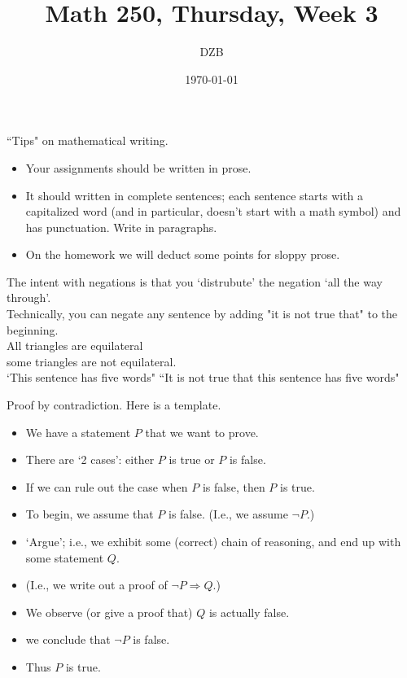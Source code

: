 \documentclass[12pt]{article}
\title{Math 250, Thursday, Week 3}
\author{DZB}
\date{\today}
\begin{document}
\maketitle

``Tips" on mathematical writing. 
\\

\begin{itemize}
\item Your assignments should be written in prose. 
\item It should written in complete sentences; each sentence starts with a capitalized word (and in particular, doesn't start with a math symbol) and has punctuation. Write in paragraphs. 
\item On the homework we will deduct some points for sloppy prose. 
\end{itemize}

The intent with negations is that you `distrubute' the negation `all the way through'. 
\\

Technically, you can negate any sentence by adding "it is not true that" to the beginning. 
\\

All triangles are equilateral
\\

some triangles are not equilateral.\\

`This sentence has five words" ``It is not true that this sentence has five words"
\newpage

Proof by contradiction. Here is a template. 
\\

\begin{itemize}
\item We have a statement $P$ that we want to prove. 
\item There are `2 cases': either $P$ is true or $P$ is false. 
\item If we can rule out the case when $P$ is false, then $P$ is true. 
\item To begin, we assume that $P$ is false. (I.e., we assume $\neg P$.)
\item `Argue'; i.e., we exhibit some (correct) chain of reasoning, and end up with some statement $Q$.
\item (I.e., we write out a proof of $\neg P \Rightarrow Q$.)
\item We observe (or give a proof that) $Q$ is actually false. 
\item we conclude that $\neg P$ is false. 
\item Thus $P$ is true. 

\end{itemize}
\end{document}
